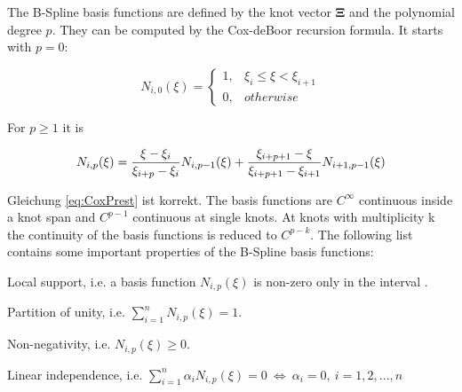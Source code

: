 The B-Spline basis functions are defined by the knot vector $\mathbf{\Xi}$ and the polynomial degree $p$. They can be computed by the Cox-deBoor recursion formula. It starts with $p=0$: 

\begin{equation}
			N_{i,0}(\xi)=\begin{cases}
		  1,  & \xi_i \leqslant \xi < \xi_{i+1}\\
		  0, & otherwise
		\end{cases}
	\label{eq:CoxPnull}
\end{equation}

For $p\geqslant 1$ it is

\begin{equation}
			N_{i,p}(\xi)=\frac{\xi-\xi_i}{\xi_{i+p}-\xi_i} N_{i,p-1}(\xi)+\frac{\xi_{i+p+1}-\xi}{\xi_{i+p+1}-\xi_{i+1}}N_{i+1,p-1}(\xi)\\
	\label{eq:CoxPrest}
\end{equation}

Gleichung \ref{eq:CoxPrest} ist korrekt.
The basis functions are $C^{\infty}$ continuous inside a knot span and $C^{p-1}$ continuous at single knots. At knots with multiplicity k the continuity of the basis functions is reduced to $C^{p-k}$. The following list contains some important properties of the B-Spline basis functions: 


\begin{compactitem}
\item Local support, i.e. a basis function  \begin{math} N_{i,p}(\xi) \end{math} is non-zero only in the interval \begin{math} [\xi_{i},\xi_{i+p+1}] \end{math}.
\item Partition of unity, i.e. \begin{math} \sum_{i=1}^n N_{i,p}(\xi)=1\end{math}.
\item Non-negativity, i.e. \begin{math} N_{i,p}(\xi) \geqslant 0 \end{math}.
\item Linear independence, i.e. \begin{math} \sum_{i=1}^n \alpha_i N_{i,p}(\xi)=0~\Leftrightarrow~\alpha_i=0,~i=1,2,...,n \end{math}
\end{compactitem}

